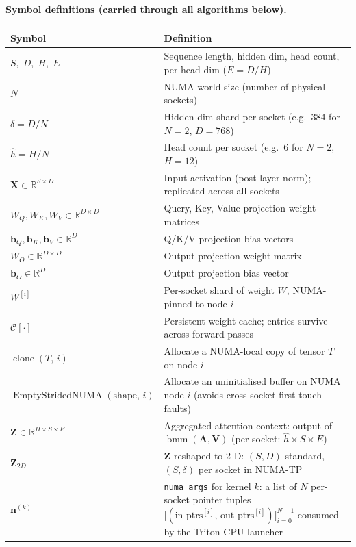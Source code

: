 \documentclass{article}
\DeclareMathOperator{\cloneop}{clone}
\DeclareMathOperator{\bmmop}{bmm}
\DeclareMathOperator{\EmptyNUMA}{EmptyStridedNUMA}
\newcommand{\numaargs}[1]{\mathbf{n}^{(#1)}}
\begin{document}
\paragraph{Symbol definitions (carried through all algorithms below).}
\begin{center}
\small
\renewcommand{\arraystretch}{1.18}
\begin{tabular}{@{} l p{9.0cm} @{}}
\toprule
Symbol & Definition \\
\midrule
$S,\;D,\;H,\;E$ &
  Sequence length, hidden dim, head count, per-head dim ($E=D/H$) \\
$N$ &
  NUMA world size (number of physical sockets) \\
$\delta = D/N$ &
  Hidden-dim shard per socket (e.g.\ $384$ for $N{=}2$, $D{=}768$) \\
$\hat{h} = H/N$ &
  Head count per socket (e.g.\ $6$ for $N{=}2$, $H{=}12$) \\
$\mathbf{X}\in\mathbb{R}^{S\times D}$ &
  Input activation (post layer-norm); replicated across all sockets \\
$W_Q,W_K,W_V\in\mathbb{R}^{D\times D}$ &
  Query, Key, Value projection weight matrices \\
$\mathbf{b}_Q,\mathbf{b}_K,\mathbf{b}_V\in\mathbb{R}^{D}$ &
  Q/K/V projection bias vectors \\
$W_O\in\mathbb{R}^{D\times D}$ &
  Output projection weight matrix \\
$\mathbf{b}_O\in\mathbb{R}^{D}$ &
  Output projection bias vector \\
$W^{[i]}$ &
  Per-socket shard of weight $W$, NUMA-pinned to node $i$ \\
$\mathcal{C}[\cdot]$ &
  Persistent weight cache; entries survive across forward passes \\
$\cloneop(T,\,i)$ &
  Allocate a NUMA-local copy of tensor $T$ on node $i$ \\
$\EmptyNUMA(\mathrm{shape},\,i)$ &
  Allocate an uninitialised buffer on NUMA node $i$
  (avoids cross-socket first-touch faults) \\
$\mathbf{Z}\in\mathbb{R}^{H\times S\times E}$ &
  Aggregated attention context: output of $\bmmop(\mathbf{A},\mathbf{V})$
  (per socket: $\hat{h}\times S\times E$) \\
$\mathbf{Z}_{2D}$ &
  $\mathbf{Z}$ reshaped to 2-D: $(S,D)$ standard, $(S,\delta)$ per socket in NUMA-TP \\
$\numaargs{k}$ &
  \texttt{numa\_args} for kernel $k$: a list of $N$ per-socket pointer tuples
  $\bigl[(\text{in-ptrs}^{[i]},\,\text{out-ptrs}^{[i]})\bigr]_{i=0}^{N-1}$
  consumed by the Triton CPU launcher \\
\bottomrule
\end{tabular}
\end{center}
\end{document}
